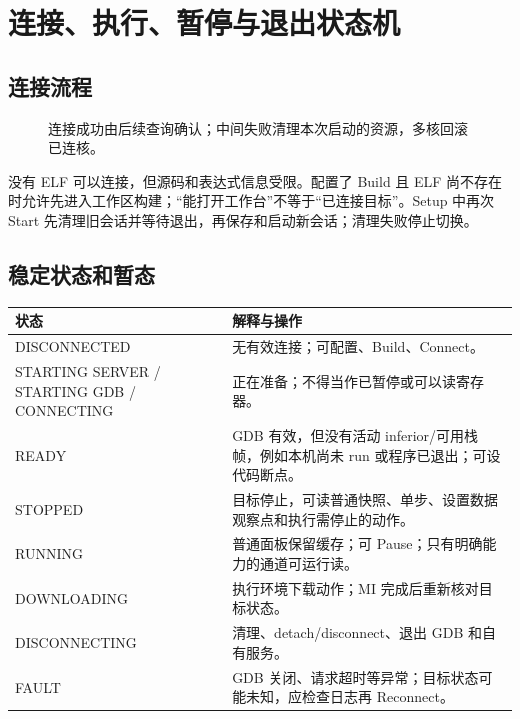 \documentclass[UTF8,a4paper,11pt,oneside,fontset=none]{ctexart}
\newcommand{\newsection}[1]{\par\Needspace{10\baselineskip}\section{#1}}
\begin{document}
\newsection{连接、执行、暂停与退出状态机}
\subsection{连接流程}
\begin{figure}[H]\centering
{}
\caption{连接成功由后续查询确认；中间失败清理本次启动的资源，多核回滚已连核。}
\end{figure}
没有 ELF 可以连接，但源码和表达式信息受限。配置了 Build 且 ELF 尚不存在时允许先进入工作区构建；“能打开工作台”不等于“已连接目标”。Setup 中再次 Start 先清理旧会话并等待退出，再保存和启动新会话；清理失败停止切换。

\subsection{稳定状态和暂态}
\noindent\begin{tabularx}{\linewidth}{@{}P{33mm}Y@{}}\toprule
状态 & 解释与操作\\\midrule
DISCONNECTED & 无有效连接；可配置、Build、Connect。\\
STARTING SERVER / STARTING GDB / CONNECTING & 正在准备；不得当作已暂停或可以读寄存器。\\
READY & GDB 有效，但没有活动 inferior/可用栈帧，例如本机尚未 run 或程序已退出；可设代码断点。\\
STOPPED & 目标停止，可读普通快照、单步、设置数据观察点和执行需停止的动作。\\
RUNNING & 普通面板保留缓存；可 Pause；只有明确能力的通道可运行读。\\
DOWNLOADING & 执行环境下载动作；MI 完成后重新核对目标状态。\\
DISCONNECTING & 清理、detach/disconnect、退出 GDB 和自有服务。\\
FAULT & GDB 关闭、请求超时等异常；目标状态可能未知，应检查日志再 Reconnect。\\\bottomrule
\end{tabularx}
\end{document}
